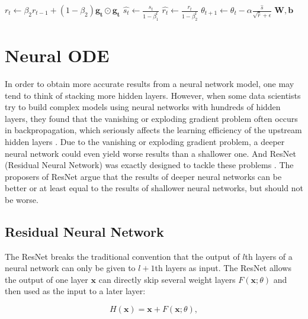 \documentclass[
	parskip, 			   %
	twoside, 			   %
	DIV=14, 			   %
	BCOR=15.0mm, 		   %
	headsepline, 		   %
	open=right, 		   %
	captions=tableheading, %
	bibliography=totoc,    %
	numbers=noenddot       %
]{scrreprt}
\begin{document}
\begin{algorithm}[h!]
\begin{algorithmic}
    \State $r_t \gets \beta_2 r_{t-1} + (1-\beta_2) \mathbf{g_t} \odot \mathbf{g_t}$ 
    \State {}
    \State $\hat{s_t} \gets \frac{s_t}{1-\beta_1^t}$ 
    \State $\hat{r_t} \gets \frac{r_t}{1-\beta_2^t}$ 
    \State {}
    \State $\theta_{t+1} \gets \theta_{t} - \alpha \frac{\hat{s}}{\sqrt{\hat{r}} + \epsilon}$ 
    \State {}
    \EndWhile
    \State \Return $\mathbf{W}, \mathbf{b}$ 
    \end{algorithmic}
\end{algorithm}


\clearpage
\chapter{Neural ODE}
\label{ch:chapter5}
In order to obtain more accurate results from a neural network model, one may tend to think of stacking more hidden layers. However, when some data scientists try to build complex models using neural networks with hundreds of hidden layers, they found that the vanishing or exploding gradient problem often occurs in backpropagation, which seriously affects the learning efficiency of the upstream hidden layers \cite{glorot2010understanding}. Due to the vanishing or exploding gradient problem, a deeper neural network could even yield worse results than a shallower one. And ResNet (Residual Neural Network) was exactly designed to tackle these problems \cite{he2016deep}. The proposers of ResNet argue that the results of deeper neural networks can be better or at least equal to the results of shallower neural networks, but should not be worse.

\section{Residual Neural Network}
The ResNet breaks the traditional convention that the output of $l$th layers of a neural network can only be given to $l+1$th layers as input. The ResNet allows the output of one layer $\mathbf{x}$ can directly skip several weight layers $F(\mathbf{x};\theta)$ and then used as the input to a later layer:

\begin{equation}
    \label{eq:ResNet}
    H(\mathbf{x})=\mathbf{x}+F(\mathbf{x};\theta),
\end{equation}
\end{document}
